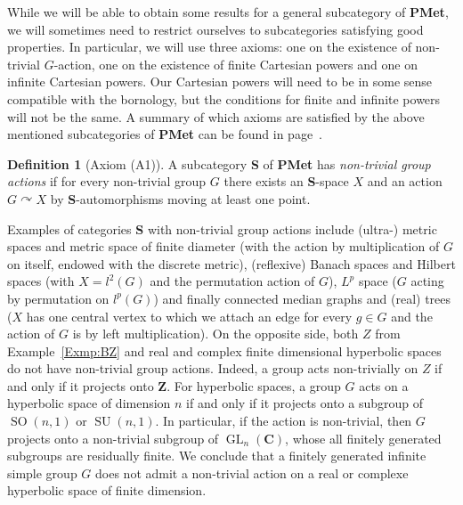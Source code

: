 \documentclass[a4paper]{article}
\theoremstyle{definition}
\newtheorem{defn}[lem]{Definition}
\DeclareMathOperator\GL{GL}
\DeclareMathOperator\SO{SO}
\DeclareMathOperator\SU{SU}
\newcommand*{\field}[1]{\mathbf{#1}}
\newcommand*{\category}[1]{\textbf{#1}}
\newcommand*{\PMet}{\category{PMet}}
\newcommand*{\CatS}{\category{S}}
\newcommand*{\Z}{\field{Z}}
\newcommand*{\C}{\field{C}}
\begin{document}
While we will be able to obtain some results for a general subcategory of \PMet, we will sometimes need to restrict ourselves to subcategories  satisfying good properties. In particular, we will use three axioms: one on the existence of non-trivial $G$-action, one on the existence of finite Cartesian powers and one on infinite Cartesian powers.
Our Cartesian powers will need to be in some sense compatible with the bornology, but the conditions for finite and infinite powers will not be the same.
A summary of which axioms are satisfied by the above mentioned subcategories of \PMet{} can be found in page~\pageref{Table1}.
%
%
\begin{defn}[Axiom (A1)]\label{Def:NonTrivialAction}
A subcategory \CatS{} of \PMet{} has \emph{non-trivial group actions} if for every non-trivial group $G$ there exists an \CatS-space $X$ and an action $G\curvearrowright X$ by \CatS-automorphisms moving at least one point.
\end{defn}
%
%
Examples of categories \CatS{} with non-trivial group actions include (ultra-) metric spaces and metric space of finite diameter (with the action by multiplication of $G$ on itself, endowed with the discrete metric), (reflexive) Banach spaces and Hilbert spaces (with $X=l^2(G)$ and the permutation action of $G$), $L^p$ space ($G$ acting by permutation on $l^p(G)$) and finally connected median graphs and (real) trees ($X$ has one central vertex to which we attach an edge for every $g\in G$ and the action of $G$ is by left multiplication).
On the opposite side, both $Z$ from Example~\ref{Exmp:BZ} and real and complex finite dimensional hyperbolic spaces do not have non-trivial group actions. Indeed, a group acts non-trivially on $Z$ if and only if it projects onto $\Z$.
For hyperbolic spaces, a group $G$ acts on a hyperbolic space of dimension $n$ if and only if it projects onto a subgroup of  $\SO(n,1)$ or $\SU(n,1)$. In particular, if the action is non-trivial, then $G$ projects onto a non-trivial subgroup of $\GL_n(\C)$, whose all finitely generated subgroups are residually finite.
We conclude that a finitely generated infinite simple group $G$ does not admit a non-trivial action on a real or complexe hyperbolic space of finite dimension.
\end{document}
